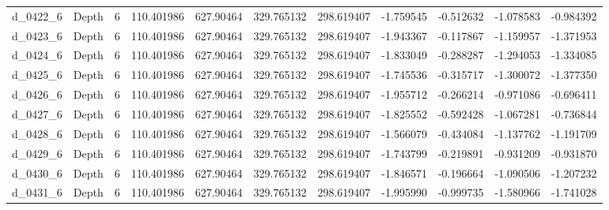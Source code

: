 \begin{tabular}{llrrrrrrrrr}
d_0422_6 &           Depth &               6 & 110.401986 &  627.90464 &  329.765132 &    298.619407 &  -1.759545 &  -0.512632 &   -1.078583 &     -0.984392 \\
d_0423_6 &           Depth &               6 & 110.401986 &  627.90464 &  329.765132 &    298.619407 &  -1.943367 &  -0.117867 &   -1.159957 &     -1.371953 \\
d_0424_6 &           Depth &               6 & 110.401986 &  627.90464 &  329.765132 &    298.619407 &  -1.833049 &  -0.288287 &   -1.294053 &     -1.334085 \\
d_0425_6 &           Depth &               6 & 110.401986 &  627.90464 &  329.765132 &    298.619407 &  -1.745536 &  -0.315717 &   -1.300072 &     -1.377350 \\
d_0426_6 &           Depth &               6 & 110.401986 &  627.90464 &  329.765132 &    298.619407 &  -1.955712 &  -0.266214 &   -0.971086 &     -0.696411 \\
d_0427_6 &           Depth &               6 & 110.401986 &  627.90464 &  329.765132 &    298.619407 &  -1.825552 &  -0.592428 &   -1.067281 &     -0.736844 \\
d_0428_6 &           Depth &               6 & 110.401986 &  627.90464 &  329.765132 &    298.619407 &  -1.566079 &  -0.434084 &   -1.137762 &     -1.191709 \\
d_0429_6 &           Depth &               6 & 110.401986 &  627.90464 &  329.765132 &    298.619407 &  -1.743799 &  -0.219891 &   -0.931209 &     -0.931870 \\
d_0430_6 &           Depth &               6 & 110.401986 &  627.90464 &  329.765132 &    298.619407 &  -1.846571 &  -0.196664 &   -1.090506 &     -1.207232 \\
d_0431_6 &           Depth &               6 & 110.401986 &  627.90464 &  329.765132 &    298.619407 &  -1.995990 &  -0.999735 &   -1.580966 &     -1.741028 \\
\bottomrule
\end{tabular}
